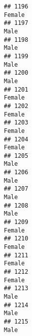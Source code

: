 \documentclass[]{article}
\begin{document}
\begin{verbatim}
## 1196                                                                                                                          Female
## 1197                                                                                                                            Male
## 1198                                                                                                                            Male
## 1199                                                                                                                            Male
## 1200                                                                                                                            Male
## 1201                                                                                                                          Female
## 1202                                                                                                                          Female
## 1203                                                                                                                          Female
## 1204                                                                                                                          Female
## 1205                                                                                                                            Male
## 1206                                                                                                                            Male
## 1207                                                                                                                            Male
## 1208                                                                                                                            Male
## 1209                                                                                                                          Female
## 1210                                                                                                                          Female
## 1211                                                                                                                          Female
## 1212                                                                                                                          Female
## 1213                                                                                                                            Male
## 1214                                                                                                                            Male
## 1215                                                                                                                            Male

\end{verbatim}
\end{document}
